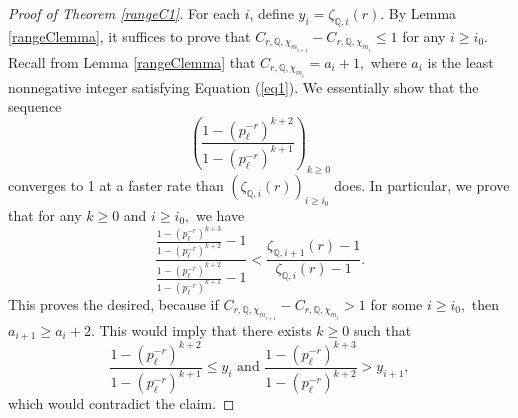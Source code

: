 \documentclass[12pt]{amsart}
\theoremstyle{definition}
\numberwithin{equation}{section}
\newcommand{\Q}{\mathbb{Q}}
\begin{document}
\begin{proof}[Proof of Theorem \ref{rangeC1}]
    For each $i$, define $y_i = \zeta_{\Q,i}(r).$
    By Lemma \ref{rangeClemma}, it suffices to prove that $C_{r,\Q,\chi_{m_{i+1}}} - C_{r,\Q,\chi_{m_i}} \leq 1$ for any $ i \geq i_0.$  Recall from Lemma \ref{rangeClemma} that $C_{r,\Q,\chi_{m_i}} = a_i+1,$ where $a_i$ is the least nonnegative integer satisfying Equation (\ref{eq1}).
    We essentially show that the sequence $$\left(\frac{1 - (p_\ell^{-r})^{k+2}}{1 - (p_\ell^{-r})^{k+1}} \right)_{k \geq 0}$$ converges to 1 at a faster rate than $(\zeta_{\Q,i}(r))_{i \geq i_0}$ does. 
    In particular, we prove that for any $k \geq0$ and $i \geq i_0,$ we have $$\frac{\frac{1 - (p_\ell^{-r})^{k+3}}{1 - (p_\ell^{-r})^{k+2}}  - 1}{\frac{1 - (p_\ell^{-r})^{k+2}}{1 - (p_\ell^{-r})^{k+1}}  - 1} < \frac{\zeta_{\Q,i+1}(r) - 1}{\zeta_{\Q,i}(r)- 1}.$$ 
    This proves the desired, because if $C_{r,\Q, \chi_{m_{i+1}}} - C_{r,\Q, \chi_{m_i}} > 1$ for some $i \geq i_0,$ then $a_{i+1} \geq a_i+ 2.$ This would imply that there exists $k \geq 0$ such that $$\frac{1 - (p_\ell^{-r})^{k+2}}{1 - (p_\ell^{-r})^{k+1}} \leq y_{i}\text{ and } \frac{1 - (p_\ell^{-r})^{k+3}}{1 - (p_\ell^{-r})^{k+2}} > y_{i+1},$$ which would contradict the claim. 
    

\end{proof}
\end{document}
